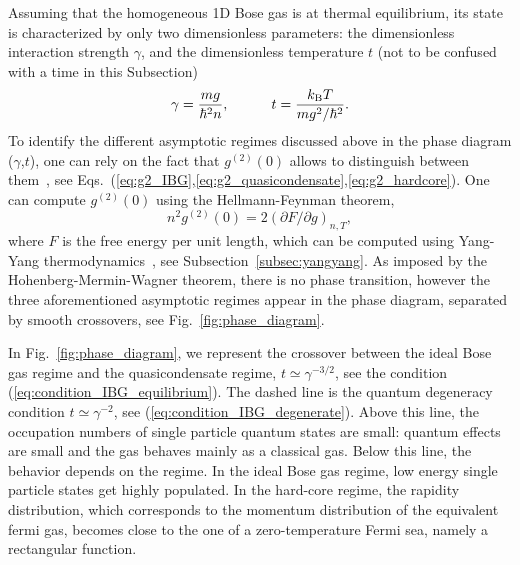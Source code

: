 \documentclass[onecolumn,amsfonts,showpacs,superscriptaddress]{revtex4-1}
\begin{document}
Assuming that the homogeneous 1D Bose gas is at thermal equilibrium, its state is characterized by only two dimensionless parameters: the dimensionless interaction strength $\gamma$, and the dimensionless temperature $t$ (not to be confused with a time in this Subsection)
\begin{equation}
    \gamma = \frac{m g}{\hbar^2 n} , \qquad \quad  t= \frac{k_{\rm B} T}{m g^2/\hbar^2}.
\end{equation}
To identify the different asymptotic regimes discussed above in the phase diagram ($\gamma$,$t$), one can rely on the fact that $g^{(2)}(0)$ allows to distinguish between them~\citep{kheruntsyan2003pair}, see Eqs.~(\ref{eq:g2_IBG},\ref{eq:g2_quasicondensate},\ref{eq:g2_hardcore}). One can compute
$g^{(2)}(0)$ using the Hellmann-Feynman theorem,
\begin{equation}
\label{eq:HelmanFeynam}
    n^2 g^{(2)}(0)=2(\partial F/\partial g)_{n,T},
\end{equation}
where $F$ is the free energy per unit length, which can be computed using Yang-Yang thermodynamics~\citep{yang1969thermodynamics}, see Subsection~\ref{subsec:yangyang}. As imposed by the Hohenberg-Mermin-Wagner theorem, there is no phase transition, however the three aforementioned asymptotic regimes appear in the phase diagram, separated by smooth crossovers, see Fig.~\ref{fig:phase_diagram}.


In Fig.~\ref{fig:phase_diagram}, we represent the crossover between the ideal Bose gas regime and the quasicondensate regime, $t \simeq \gamma^{-3/2}$, see the condition (\ref{eq:condition_IBG_equilibrium}). The dashed line is the quantum degeneracy condition $t\simeq \gamma^{-2}$, see (\ref{eq:condition_IBG_degenerate}).
Above this line, 
the occupation numbers of single particle quantum states are small: quantum effects are small and the gas behaves mainly as a  classical gas. Below this line, the behavior depends on the regime. In the ideal Bose gas regime, low energy single particle states get highly populated. 
In the hard-core regime, the rapidity distribution, which corresponds to the momentum distribution of the equivalent fermi gas, becomes close to the one of a zero-temperature Fermi sea, namely a rectangular function.
\end{document}
